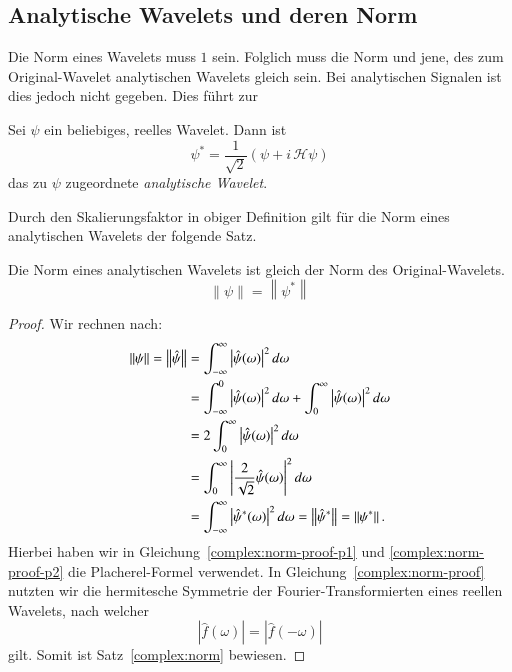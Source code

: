 \subsection{Analytische Wavelets und deren Norm}

Die Norm eines Wavelets muss $1$ sein.
Folglich muss die Norm und jene, des zum Original-Wavelet analytischen Wavelets gleich sein.
Bei analytischen Signalen ist dies jedoch nicht gegeben.
Dies führt zur
\begin{definition}
	Sei $\psi$ ein beliebiges, reelles Wavelet. Dann ist
	\begin{equation}
		\psi^\ast = \frac{1}{\sqrt{2}}\left(\psi + i\,\mathcal{H}\psi\right) \label{complex:anawave}
	\end{equation}
	das zu $\psi$ zugeordnete \emph{analytische Wavelet}.
\end{definition}

Durch den Skalierungsfaktor in obiger Definition gilt für die Norm eines analytischen Wavelets der folgende Satz.
\begin{satz}
	\label{complex:norm}
	Die Norm eines analytischen Wavelets ist gleich der Norm des Original-Wavelets.
	\[\left\|\psi\right\| = \left\|\psi^\ast\right\|\]
\end{satz}

\begin{proof}
	Wir rechnen nach:
	\begin{align}
		\left\|\psi\right\| = \left\|\hat{\psi}\right\| 
		&= \int_{-\infty}^{\infty}\left|\hat{\psi}(\omega)\right|^2 d\omega \label{complex:norm-proof-p1}\\
		&= \int_{-\infty}^{0}\left|\hat{\psi}(\omega)\right|^2 d\omega +  \int_{0}^{\infty}\left|\hat{\psi}(\omega)\right|^2 d\omega \notag\\
		&=  2\int_{0}^{\infty}\left|\hat{\psi}(\omega)\right|^2 d\omega \label{complex:norm-proof}\\
		&=  \int_{0}^{\infty}\left|\frac{2}{\sqrt{2}}\hat{\psi}(\omega)\right|^2 d\omega \notag\\
		&=  \int_{-\infty}^{\infty}\left|\hat{\psi}^\ast(\omega)\right|^2 d\omega 
		= \left\|\hat{\psi}^\ast\right\| = \left\|\psi^\ast\right\|.\label{complex:norm-proof-p2}
	\end{align}
	Hierbei haben wir in Gleichung~\eqref{complex:norm-proof-p1} und \eqref{complex:norm-proof-p2} die Placherel-Formel verwendet.
	In Gleichung~\eqref{complex:norm-proof} nutzten wir die hermitesche Symmetrie der Fourier-Transformierten eines reellen Wavelets, nach welcher
	\[\left|\hat{f}(\omega)\right| = \left|\hat{f}(-\omega)\right|\]
	gilt.
	Somit ist Satz~\ref{complex:norm} bewiesen.
\end{proof}
